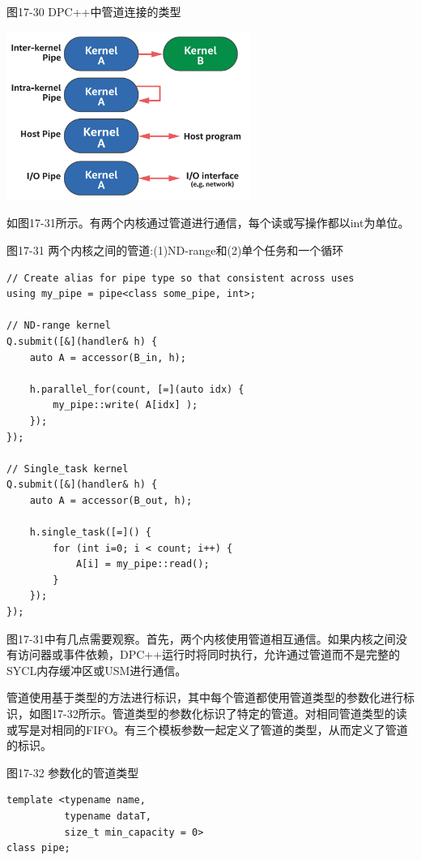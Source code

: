 \hspace*{\fill} \par %
图17-30 DPC++中管道连接的类型
\begin{center}
	\includegraphics[width=0.6\textwidth]{content/chapter-17/images/25}
\end{center}

如图17-31所示。有两个内核通过管道进行通信，每个读或写操作都以int为单位。\par

\hspace*{\fill} \par %
图17-31 两个内核之间的管道:(1)ND-range和(2)单个任务和一个循环
\begin{lstlisting}[caption={}]
// Create alias for pipe type so that consistent across uses
using my_pipe = pipe<class some_pipe, int>;

// ND-range kernel
Q.submit([&](handler& h) {
	auto A = accessor(B_in, h);
	
	h.parallel_for(count, [=](auto idx) {
		my_pipe::write( A[idx] );
	});
});

// Single_task kernel
Q.submit([&](handler& h) {
	auto A = accessor(B_out, h);
	
	h.single_task([=]() {
		for (int i=0; i < count; i++) {
			A[i] = my_pipe::read();
		}
	});
});
\end{lstlisting}

图17-31中有几点需要观察。首先，两个内核使用管道相互通信。如果内核之间没有访问器或事件依赖，DPC++运行时将同时执行，允许通过管道而不是完整的SYCL内存缓冲区或USM进行通信。\par

管道使用基于类型的方法进行标识，其中每个管道都使用管道类型的参数化进行标识，如图17-32所示。管道类型的参数化标识了特定的管道。对相同管道类型的读或写是对相同的FIFO。有三个模板参数一起定义了管道的类型，从而定义了管道的标识。\par

\hspace*{\fill} \par %
图17-32 参数化的管道类型
\begin{lstlisting}[caption={}]
template <typename name,
		  typename dataT,
		  size_t min_capacity = 0>
class pipe;
\end{lstlisting}

